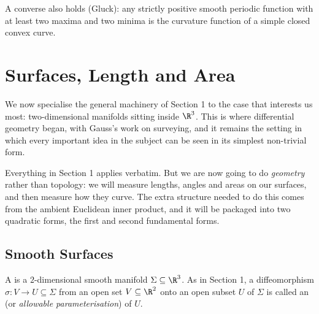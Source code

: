 \begin{center}
\end{center}

\begin{remark}
    A converse also holds (Gluck): any strictly positive smooth periodic function with at least two maxima and two minima is the curvature function of a simple closed convex curve.
\end{remark}


\section{Surfaces, Length and Area}

We now specialise the general machinery of Section 1 to the case that interests us most: two-dimensional manifolds sitting inside $\R^3$. This is where differential geometry began, with Gauss's work on surveying, and it remains the setting in which every important idea in the subject can be seen in its simplest non-trivial form.

Everything in Section 1 applies verbatim. But we are now going to do \emph{geometry} rather than topology: we will measure lengths, angles and areas on our surfaces, and then measure how they curve. The extra structure needed to do this comes from the ambient Euclidean inner product, and it will be packaged into two quadratic forms, the first and second fundamental forms.

\subsection{Smooth Surfaces}

\begin{definition}
    A  is a $2$-dimensional smooth manifold $\Sigma \subseteq \R^3$. As in Section 1, a diffeomorphism $\sigma: V \rightarrow U \subseteq \Sigma$ from an open set $V \subseteq \R^2$ onto an open subset $U$ of $\Sigma$ is called an  (or \emph{allowable parameterisation}) of $U$.
\end{definition}


